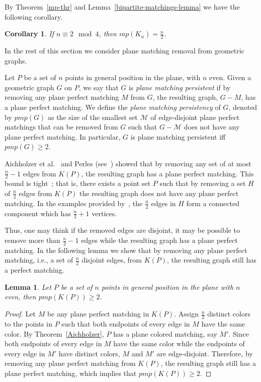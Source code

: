 \documentclass[11pt,a4paper]{article}
\newcommand{\Kn}[1]{K#1}
\newtheorem{lemma}{Lemma}
\newtheorem{corollary}{Corollary}
\begin{document}
By Theorem~\ref{mp-thr} and Lemma~\ref{bipartite-matchings-lemma} we have the following corollary.

\begin{corollary}
If $n\equiv 2 \mod 4$, then $mp(K_n)=\frac{n}{2}$. 
\end{corollary}

In the rest of this section we consider plane matching removal from geometric graphs.

Let $P$ be a set of $n$ points in general position in the plane, with $n$ even. Given a geometric graph $G$ on $P$, we say that $G$ is {\em plane matching persistent} if by removing any plane perfect matching $M$ from $G$, the resulting graph, $G-M$, has a plane perfect matching. We define the {\em plane matching persistency} of $G$, denoted by $pmp(G)$ as the size of the smallest set $\mathcal{M}$ of edge-disjoint plane perfect matchings that can be removed from $G$ such that $G-\mathcal{M}$ does not have any plane perfect matching. In particular, $G$ is plane matching persistent iff $pmp(G)\ge 2$.

Aichholzer et al.~\cite{Aichholzer2010} and Perles (see~\cite{Keller2012}) showed that by removing any set of at most $\frac{n}{2}-1$ edges from $\Kn{(P)}$, the resulting graph has a plane perfect matching. This bound is tight~\cite{Aichholzer2010}; that is, there exists a point set $P$ such that by removing a set $H$ of $\frac{n}{2}$ edges from $\Kn{(P)}$ the resulting graph does not have any plane perfect matching. In the examples provided by~\cite{Aichholzer2010}, the $\frac{n}{2}$ edges in $H$ form a connected component which has $\frac{n}{2}+1$ vertices. 

Thus, one may think if the removed edges are disjoint, it may be possible to remove more than $\frac{n}{2}-1$ edges while the resulting graph has a plane perfect matching.
In the following lemma we show that by removing any plane perfect matching, i.e., a set of $\frac{n}{2}$ disjoint edges, from $\Kn{(P)}$, the resulting graph still has a perfect matching.

\begin{lemma}
\label{pmp2-lemma}
Let $P$ be a set of $n$ points in general position in the plane with $n$ even, then $pmp(\Kn{(P)})\ge 2$.
\end{lemma}
\begin{proof}
 Let $M$ be any plane perfect matching in $\Kn{(P)}$. Assign $\frac{n}{2}$ distinct colors to the points in $P$ such that both endpoints of every edge in $M$ have the same color. By Theorem~\ref{Aichholzer}, $P$ has a plane colored matching, say $M'$. Since both endpoints of every edge in $M$ have the same color while the endpoints of every edge in $M'$ have distinct colors, $M$ and $M'$ are edge-disjoint. Therefore, by removing any plane perfect matching from $\Kn{(P)}$, the resulting graph still has a plane perfect matching, which implies that $pmp(\Kn{(P)})\ge 2$.
\end{proof}
\end{document}
